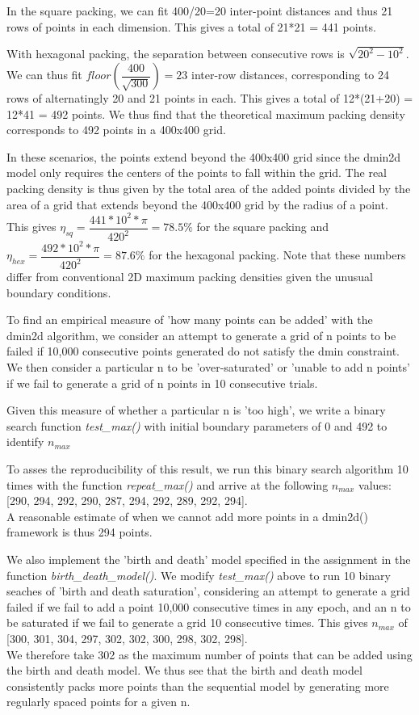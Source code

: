 \documentclass{article}
\begin{document}
In the square packing, we can fit 400/20=20 inter-point distances and thus 21 rows of points in each dimension. This gives a total of 21*21 = 441 points.

With hexagonal packing, the separation between consecutive rows is $\sqrt{20^2-10^2}$. We can thus fit $floor(\dfrac{400}{\sqrt{300}}) = 23$ inter-row distances, corresponding to 24 rows of alternatingly 20 and 21 points in each. This gives a total of
12*(21+20) = 12*41 = 492
points.
We thus find that the theoretical maximum packing density corresponds to 492 points in a 400x400 grid.

In these scenarios, the points extend beyond the 400x400 grid since the dmin2d model only requires the centers of the points to fall within the grid. The real packing density is thus given by the total area of the added points divided by the area of a grid that extends beyond the 400x400 grid by the radius of a point. This gives
$\eta_{sq} = \dfrac{441*10^2*\pi}{420^2} = 78.5\%$ for the square packing and $\eta_{hex}=\dfrac{492*10^2*\pi}{420^2} = 87.6\%$ for the hexagonal packing. Note that these numbers differ from conventional 2D maximum packing densities given the unusual boundary conditions.

To find an empirical measure of 'how many points can be added' with the dmin2d algorithm, we consider an attempt to generate a grid of n points to be failed if 10,000 consecutive points generated do not satisfy the dmin constraint.
We then consider a particular n to be 'over-saturated' or 'unable to add n points' if we fail to generate a grid of n points in 10 consecutive trials.

Given this measure of whether a particular n is 'too high', we write a binary search function \textit{test\_max()} with initial boundary parameters of 0 and 492 to identify $n_{max}$

To asses the reproducibility of this result, we run this binary search algorithm 10 times with the function \textit{repeat\_max()} and arrive at the following $n_{max}$ values:
[290,
294,
292,
290,
287,
294,
292,
289,
292,
294].\\
A reasonable estimate of when we cannot add more points in a dmin2d() framework is thus 294 points.

We also implement the 'birth and death' model specified in the assignment in the function \textit{birth\_death\_model()}. We modify \textit{test\_max()} above to run 10 binary seaches of 'birth and death saturation', considering an attempt to generate a grid failed if we fail to add a point 10,000 consecutive times in any epoch, and an n to be saturated if we fail to generate a grid 10 consecutive times.
This gives  $n_{max}$ of
[300,
301,
304,
297,
302,
302,
300,
298,
302,
298].\\
We therefore take 302 as the maximum number of points that can be added using the birth and death model. We thus see that the birth and death model consistently packs more points than the sequential model by generating more regularly spaced points for a given n.
\end{document}
